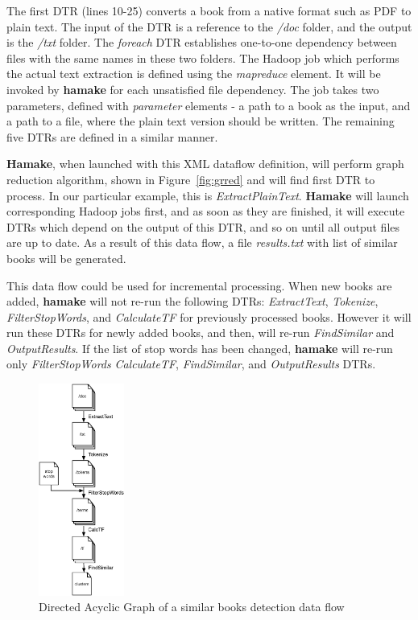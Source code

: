 \documentclass[10pt,conference,letterpaper]{IEEEtran}
\begin{document}


The first DTR (lines 10-25) converts a book from a native format such
as PDF to plain text. The input of the DTR is a reference to the
\emph{/doc} folder, and the output is the \emph{/txt} folder. The
\emph{foreach} DTR establishes one-to-one dependency between files
with the same names in these two folders. The Hadoop job which
performs the actual text extraction is defined using the \emph{mapreduce}
element. It will be invoked by \textbf{hamake} for each unsatisfied
file dependency. The job takes two parameters, defined with
\emph{parameter} elements - a path to a book as the input, and a path to a
file, where the plain text version should be written. The remaining five
DTRs are defined in a similar manner.

\textbf{Hamake}, when launched with this XML dataflow definition, will
perform graph reduction algorithm, shown in Figure~\ref{fig:grred} and
will find first DTR to process. In our particular example, this is
\emph{ExtractPlainText}. \textbf{Hamake} will launch corresponding
Hadoop jobs first, and as soon as they are finished, it will execute
DTRs which depend on the output of this DTR, and so on until all
output files are up to date. As a result of this data flow, a file
\emph{results.txt} with list of similar books will be generated.

This data flow could be used for incremental processing. When new
books are added, \textbf{hamake} will not re-run the following DTRs:
\emph{ExtractText}, \emph{Tokenize}, \emph{FilterStopWords}, and
\emph{CalculateTF} for previously processed books. However it will run
these DTRs for newly added books, and then, will re-run
\emph{FindSimilar} and \emph{OutputResults}.  If the list of stop
words has been changed, \textbf{hamake} will re-run only
\emph{FilterStopWords} \emph{CalculateTF}, \emph{FindSimilar}, and
\emph{OutputResults} DTRs.

\begin{figure}[htp]
\centering
\includegraphics[width=0.25\textwidth]{SimilarityAlgDAG.eps}
\caption{Directed Acyclic Graph of a similar books detection data flow}
\label{fig:SimilarityAlgDAG}
\end{figure}
\end{document}
